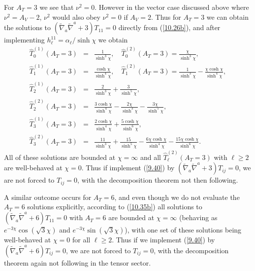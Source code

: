 For $A_T=3$ we see that $\nu^2=0$. However in the vector case discussed above where $\nu^2=A_V-2$, $\nu^2$ would also obey $\nu^2=0$ if $A_V=2$. Thus for $A_T=3$ we can obtain the solutions to $(\tilde{\nabla}_a\tilde{\nabla}^a+3)T_{11}=0$ directly from (\ref{10.26b}), and after implementing $h^{11}_{\ell}=\alpha_{\ell}/\sinh\chi$ we obtain 
%
\begin{eqnarray}
\hat{T}^{(1)}_0(A_T=3)&=&\frac{1}{ \sinh^3\chi},\quad \hat{T}^{(2)}_0(A_T=3)=\frac{\chi }{\sinh^3\chi},
\nonumber\\
\hat{T}^{(1)}_1(A_T=3)&=&\frac{\cosh \chi }{ \sinh^4\chi},\quad \hat{T}^{(2)}_1(A_T=3)=\frac{1}{ \sinh^3\chi}-\frac{\chi\cosh\chi}{\sinh^4\chi},
\nonumber\\
\hat{T}^{(1)}_2(A_T=3)&=&\frac{2}{ \sinh^3\chi}+\frac{3}{\sinh^5\chi},
\nonumber\\
 \hat{T}^{(2)}_2(A_T=3)&=&\frac{3\cosh\chi}{\sinh^4\chi}-\frac{2\chi}{\sinh^3\chi}-\frac{3\chi }{\sinh^5\chi},
\nonumber\\
\hat{T}^{(1)}_3(A_T=3)&=&\frac{2\cosh\chi}{\sinh^4\chi}+\frac{5\cosh\chi}{\sinh^6\chi},
\nonumber\\
\hat{T}^{(2)}_3(A_T=3)&=&\frac{11}{\sinh^3\chi}+\frac{15}{\sinh^5\chi}-\frac{6\chi\cosh\chi}{\sinh^4\chi}-\frac{15\chi\cosh\chi }{\sinh^6\chi}.~~~
\label{10.38b}
\end{eqnarray}
%
All of these solutions are bounded at $\chi=\infty$ and all $\hat{T}^{(2)}_{\ell}(A_T=3)$ with $\ell\geq 2$ are well-behaved at $\chi=0$.  Thus if implement (\ref{9.40}) by $(\tilde{\nabla}_a\tilde{\nabla}^a+3)T_{ij}=0$,  we are not forced to $T_{ij}=0$, with the decomposition theorem not then following.

A similar outcome occurs for $A_T=6$, and even though we do not evaluate the $A_T=6$ solutions explicitly, according to (\ref{10.35b}) all solutions to $(\tilde{\nabla}_a\tilde{\nabla}^a+6)T_{11}=0$ with $A_T=6$ are bounded at $\chi=\infty$ (behaving as $e^{-3\chi}\cos(\surd{3}\chi)$ and $e^{-3\chi}\sin(\surd{3}\chi)$), with one set of these solutions being well-behaved at $\chi=0$ for all $\ell \geq 2$.  Thus if we implement (\ref{9.40}) by $(\tilde{\nabla}_a\tilde{\nabla}^a+6)T_{ij}=0$,  we are not forced to $T_{ij}=0$, with the decomposition theorem again not following in the tensor sector.
